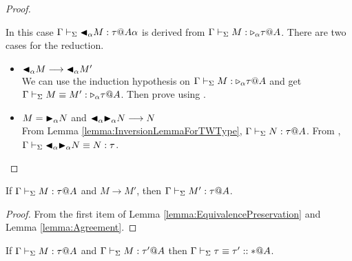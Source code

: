 \begin{proof}
\begin{itemize}
            In this case \( \G\V\TBL_{\alpha}M:\tau@{A\alpha} \) is derived from \( \G\V M:\TW_{\alpha}\tau@A \). There are two cases for the reduction.
            \begin{itemize}
                \item \( {\mathop{\blacktriangleleft}}_{\alpha}M \longrightarrow {\mathop{\blacktriangleleft}}_{\alpha}M' \) \\
                    We can use the induction hypothesis on \( \G\V M:\TW_{\alpha}\tau@A \) and get \( \G \V M \E M' : \TW_{\alpha}\tau@A \). Then prove using \QTBL.
                \item \( M = {\mathop{\blacktriangleright}}_\alpha N \) and \( {\mathop{\blacktriangleleft}}_{\alpha}{\mathop{\blacktriangleright}}_\alpha N \longrightarrow N \) \\
                    From Lemma \ref{lemma:InversionLemmaForTWType}, \( \Gamma \vdash_\Sigma N
                    : \tau @ A \). From \QTBLTB, \( \Gamma \vdash_\Sigma
                    {\mathop{\blacktriangleleft}}_{\alpha}{\mathop{\blacktriangleright}}_\alpha N \equiv N : \tau \).
            \end{itemize}
    \end{itemize}
\end{proof}

\begin{theorem}
    \label{theorem:TypePreservation}
    If \( \Gamma \vdash_\Sigma M : \tau @ A \) and \( M \longrightarrow M' \), then \( \Gamma \vdash_\Sigma M' : \tau @ A \).
\end{theorem}

\begin{proof}
    From the first item of Lemma \ref{lemma:EquivalencePreservation} and Lemma \ref{lemma:Agreement}.
\end{proof}

\begin{lemma}
    \label{lemma:TypesOfTheSameTerm}
    If \( \Gamma \vdash_\Sigma M : \tau @ A \) and \( \Gamma \vdash_\Sigma M : \tau' @ A \) then \( \Gamma \vdash_\Sigma \tau \equiv \tau' :: * @ A \).
\end{lemma}

